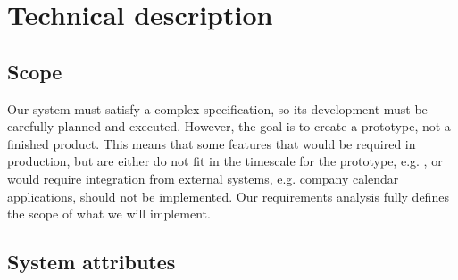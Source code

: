 \documentclass[10pt]{article}
\begin{document}

\section{Technical description}

\subsection{Scope}
Our system must satisfy a complex specification, so its development must be
carefully planned and executed. However, the goal is to create a prototype, not
a finished product. This means that some features that would be required in
production, but are either do not fit in the timescale for the prototype, e.g. ,
or would require integration from external systems, e.g. company calendar
applications, should not be implemented. Our requirements analysis fully defines
the scope of what we will implement.

\subsection{System attributes}
\end{document}
